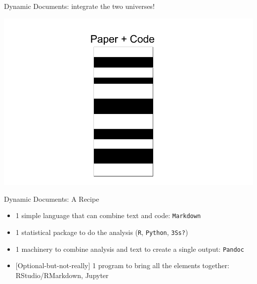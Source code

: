 \documentclass[ignorenonframetext,]{beamer}
\providecommand{\tightlist}{%
  \setlength{\itemsep}{0pt}\setlength{\parskip}{0pt}}
\begin{document}
\begin{frame}{Dynamic Documents: integrate the two universes!}
\protect\hypertarget{dynamic-documents-integrate-the-two-universes}{}

\includegraphics{./One universe.png}

\end{frame}

\begin{frame}[fragile]{Dynamic Documents: A Recipe}
\protect\hypertarget{dynamic-documents-a-recipe}{}

\begin{itemize}
\tightlist
\item
  1 simple language that can combine text and code: \texttt{Markdown}
\item
  1 statistical package to do the analysis (\texttt{R}, \texttt{Python},
  \texttt{3S\textquotesingle{}s?})
\item
  1 machinery to combine analysis and text to create a single output:
  \texttt{Pandoc}
\item
  {[}Optional-but-not-really{]} 1 program to bring all the elements
  together: RStudio/RMarkdown, Jupyter
\end{itemize}

\end{frame}
\end{document}
